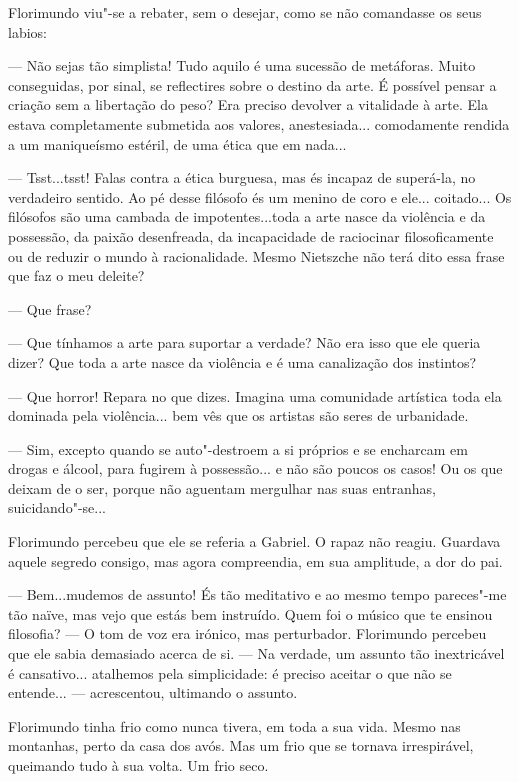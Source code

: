 Florimundo viu"-se a rebater, sem o desejar, como se não comandasse os
seus labios:

--- Não sejas tão simplista! Tudo aquilo é uma sucessão de metáforas.
Muito conseguidas, por sinal, se reflectires sobre o destino da arte. É
possível pensar a criação sem a libertação do peso? Era preciso devolver
a vitalidade à arte. Ela estava completamente submetida aos valores,
anestesiada... comodamente rendida a um maniqueísmo estéril, de uma
ética que em nada...

--- Tsst...tsst! Falas contra a ética burguesa, mas és incapaz de
superá-la, no verdadeiro sentido. Ao pé desse filósofo és um menino de
coro e ele... coitado... Os filósofos são uma cambada de
impotentes...toda a arte nasce da violência e da possessão, da paixão
desenfreada, da incapacidade de raciocinar filosoficamente ou de reduzir
o mundo à racionalidade. Mesmo Nietszche não terá dito essa frase que
faz o meu deleite?

--- Que frase?

--- Que tínhamos a arte para suportar a verdade? Não era isso que ele
queria dizer? Que toda a arte nasce da violência e é uma canalização dos
instintos?

--- Que horror! Repara no que dizes. Imagina uma comunidade artística toda
ela dominada pela violência... bem vês que os artistas são seres de
urbanidade.

--- Sim, excepto quando se auto"-destroem a si próprios e se encharcam em
drogas e álcool, para fugirem à possessão... e não são poucos os casos!
Ou os que deixam de o ser, porque não aguentam mergulhar nas suas
entranhas, suicidando"-se...

Florimundo percebeu que ele se referia a Gabriel. O rapaz não reagiu.
Guardava aquele segredo consigo, mas agora compreendia, em sua
amplitude, a dor do pai.

--- Bem...mudemos de assunto! És tão meditativo e ao mesmo tempo
pareces"-me tão naïve, mas vejo que estás bem instruído. Quem foi o
músico que te ensinou filosofia? --- O tom de voz era irónico, mas
perturbador. Florimundo percebeu que ele sabia demasiado acerca de si. ---
Na verdade, um assunto tão inextricável é cansativo... atalhemos pela
simplicidade: é preciso aceitar o que não se entende... --- acrescentou,
ultimando o assunto.

Florimundo tinha frio como nunca tivera, em toda a sua vida. Mesmo nas
montanhas, perto da casa dos avós. Mas um frio que se tornava
irrespirável, queimando tudo à sua volta. Um frio seco.

